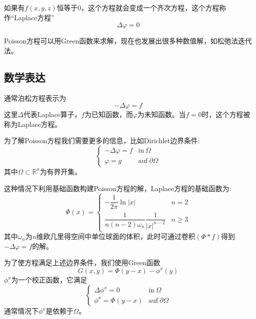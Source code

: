 \documentclass[twoside,twocolumn]{article}
\begin{document}
\begin{CJK*}{UTF8}{gkai}
	如果有$f(x,y,z)$恒等于$0$，这个方程就会变成一个齐次方程，这个方程称作“Laplace方程”
	\begin{equation*}
	\Delta \varphi = 0
	\end{equation*}
	
	Poisson方程可以用Green函数来求解，现在也发展出很多种数值解，如松弛法迭代法。
	\subsection{数学表达}
	通常泊松方程表示为
	\begin{equation*}
	-\Delta\varphi=f
	\end{equation*}
	这里$\Delta$代表Laplace算子，$f$为已知函数，而$\varphi$为未知函数。当$f=0$时，这个方程被称为Laplace方程。
	
	为了解Poisson方程我们需要更多的信息，比如Dirichlet边界条件: 
	\begin{equation*}
	\begin{cases}
	-\Delta \varphi =f&{\text{in}}\ \Omega \\
	\varphi =g&{\text{auf}}\ \partial \Omega
	\end{cases}
	\end{equation*}
	其中$\Omega\subset\mathbb{R}^{n}$为有界开集。
	
	这种情况下利用基础函数构建Poisson方程的解，Laplace方程的基础函数为: 
	\begin{equation*}
	\Phi (x)=
		\begin{cases}
		-{\dfrac {1}{2\pi }}\ln |x|&n=2\\
		{\dfrac {1}{n(n-2)\omega _{n}}}{\dfrac {1}{|x|^{n-2}}}&n\geq 3
		\end{cases}
	\end{equation*}
	其中$\omega _{n}$为$n$维欧几里得空间中单位球面的体积，此时可通过卷积$(\Phi *f)$得到$-\Delta \varphi =f$的解。
	
	为了使方程满足上述边界条件，我们使用Green函数
	\begin{equation*}
	G(x,y)=\Phi (y-x)-\phi ^{x}(y)
	\end{equation*}
	$\phi ^{x}$为一个校正函数，它满足
	\begin{equation*}
	\begin{cases}
	\Delta \phi ^{x}=0&{\text{in}}\ \Omega \\
	\phi ^{x}=\Phi (y-x)&{\text{auf}}\ \partial \Omega 
	\end{cases}
	\end{equation*}
	通常情况下$\phi ^{x}$是依赖于$\Omega$。
	

\end{CJK*}
\end{document}
